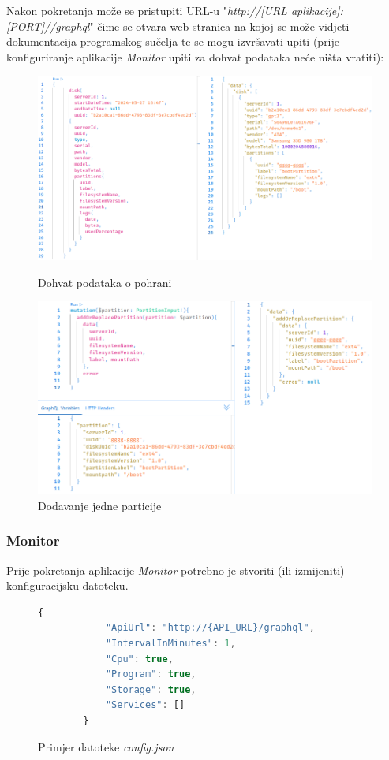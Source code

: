 \documentclass[zavrsnirad]{fer}
\begin{document}
Nakon pokretanja može se pristupiti URL-u "\textit{http://[URL aplikacije]:[PORT]//graphql}" čime se otvara web-stranica na kojoj se može vidjeti dokumentacija programskog sučelja te se mogu izvršavati upiti (prije konfiguriranje aplikacije \textit{Monitor} upiti za dohvat podataka neće ništa vratiti):
\begin{figure}[htb!]
	\centering
	\includegraphics[width=1\linewidth]{images/api_query.png} 
	\caption{Dohvat podataka o pohrani}
	\label{slk:api_query}
	\includegraphics[width=1\linewidth]{images/api_mutation.png} 
	\caption{Dodavanje jedne particije}
	\label{slk:api_mutation}
\end{figure}
\FloatBarrier

\subsubsection{Monitor}
Prije pokretanja aplikacije \textit{Monitor} potrebno je stvoriti (ili izmijeniti) konfiguracijsku datoteku.
\begin{figure}[htb!]
	\centering
	\begin{lstlisting}[language=Javascript]
		{
			"ApiUrl": "http://{API_URL}/graphql",
			"IntervalInMinutes": 1,
			"Cpu": true,
			"Program": true,
			"Storage": true,
			"Services": []
		}
	\end{lstlisting}
	\caption{Primjer datoteke \textit{config.json}}
\end{figure}
\FloatBarrier
\end{document}

